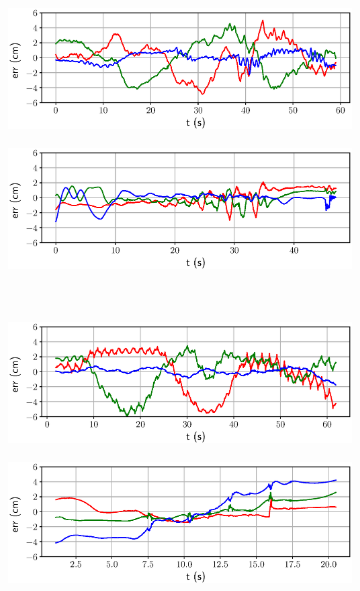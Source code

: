 \begin{figure}[t]
     \centering
     \begin{subfigure}{0.5\textwidth}
         \centering
         \includegraphics[width=\textwidth]{figures/absolute/terr_loop_twice.eps}
     \end{subfigure}%
     \hfill
     \begin{subfigure}{0.5\textwidth}
         \centering
         \includegraphics[width=\textwidth]{figures/absolute/terr_stairs1.eps}
     \end{subfigure}%
     \\
    \begin{subfigure}{0.5\textwidth}
         \centering
         \includegraphics[width=\textwidth]{figures/absolute/terr_robot1_walking.eps}
     \end{subfigure}%
     \hfill
     \begin{subfigure}{0.5\textwidth}
         \centering
         \includegraphics[width=\textwidth]{figures/absolute/terr_descending2.eps}

\end{subfigure}
\end{figure}
